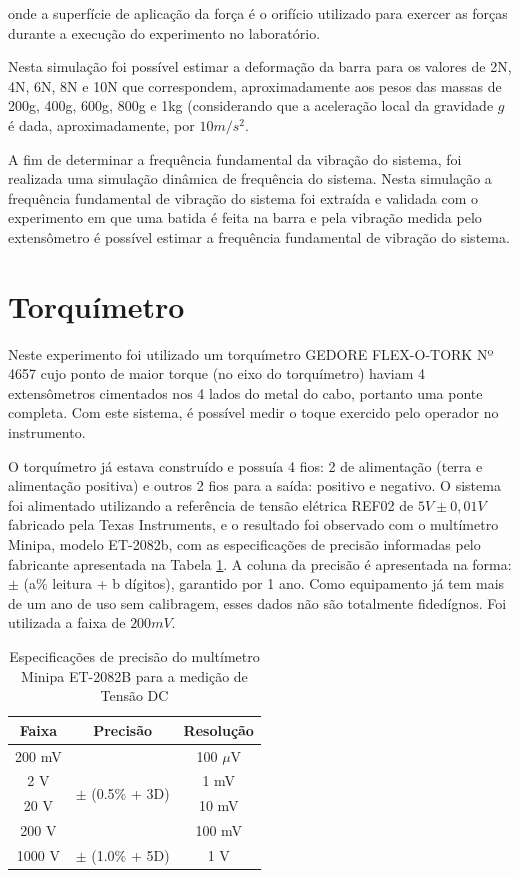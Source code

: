 \documentclass[a4paper]{instrumentacao}
\begin{document}
\noindent onde a superfície de aplicação da força é o orifício utilizado para exercer as forças durante a execução do experimento no laboratório.

Nesta simulação foi possível estimar a deformação da barra para os valores de 2N, 4N, 6N, 8N e 10N que correspondem, aproximadamente aos pesos das massas de 200g, 400g, 600g, 800g e 1kg (considerando que a aceleração local da gravidade $g$ é dada, aproximadamente, por $10 m/s^2$.

A fim de determinar a frequência fundamental da vibração do sistema, foi realizada uma simulação dinâmica de frequência do sistema. Nesta simulação a frequência fundamental de vibração do sistema foi extraída e validada com o experimento em que uma batida é feita na barra e pela vibração medida pelo extensômetro é possível estimar a frequência fundamental de vibração do sistema.


\section{Torquímetro}
Neste experimento foi utilizado um torquímetro GEDORE FLEX-O-TORK Nº 4657 cujo ponto de maior torque (no eixo do torquímetro) haviam 4 extensômetros cimentados nos 4 lados do metal do cabo, portanto uma ponte completa. Com este sistema, é possível medir o toque exercido pelo operador no instrumento.

O torquímetro já estava construído e possuía 4 fios: 2 de alimentação (terra e alimentação positiva) e outros 2 fios para a saída: positivo e negativo. O sistema foi alimentado utilizando a referência de tensão elétrica REF02 de $5V \pm 0,01V$ \cite{datasheet-ref02} fabricado pela Texas Instruments, e o resultado foi observado com o multímetro Minipa, modelo ET-2082b, com as especificações de precisão informadas pelo fabricante apresentada na Tabela \ref{tab:precisão-multimetro}. A coluna da precisão é apresentada na forma: $\pm$ (a$\%$ leitura + b dígitos), garantido por 1 ano. Como equipamento já tem mais de um ano de uso sem calibragem, esses dados não são totalmente fidedígnos. Foi utilizada a faixa de $200 mV$.

\begin{table}[H]
\centering
\caption{Especificações de precisão do multímetro Minipa ET-2082B para a medição de Tensão DC}
\label{tab:precisão-multimetro}
\begin{tabular}{|c|c|c|}
\hline
\textbf{Faixa} & \textbf{Precisão} & \textbf{Resolução} \\ \hline
200 mV         & \multirow{4}{*}{$\pm$ (0.5\% + 3D)} & 100 $\mu$V \\ \cline{1-1} \cline{3-3} 
2 V            &                              & 1 mV               \\ \cline{1-1} \cline{3-3} 
20 V           &                              & 10 mV              \\ \cline{1-1} \cline{3-3} 
200 V          &                              & 100 mV             \\ \hline
1000 V         & $\pm$ (1.0\% + 5D)           & 1 V                \\ \hline
\end{tabular}
\end{table}
\end{document}
